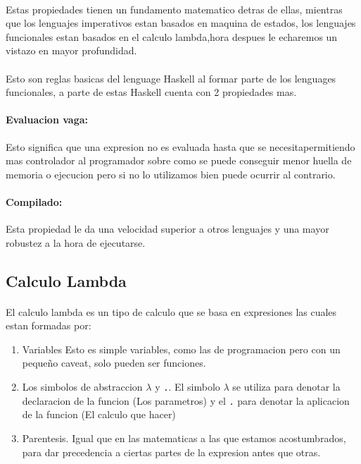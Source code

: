 \documentclass{article}
\begin{document}
		\paragraph{} Estas propiedades tienen un fundamento matematico detras de ellas, mientras que los lenguajes imperativos estan basados en maquina de estados, los lenguajes funcionales estan basados en el calculo lambda,hora despues le echaremos un vistazo en mayor profundidad.

		\paragraph{} Esto son reglas basicas del lenguage Haskell al formar parte de los lenguages funcionales, a parte de estas Haskell cuenta con 2 propiedades mas.
		
		\paragraph{Evaluacion vaga:} Esto significa que una expresion no es evaluada hasta que se necesitapermitiendo mas controlador al programador sobre como se puede conseguir menor huella de memoria o ejecucion pero si no lo utilizamos bien puede ocurrir al contrario.
		
		\paragraph{Compilado:} Esta propiedad le da una velocidad superior a otros lenguajes y una mayor robustez a la hora de ejecutarse.

		\subsection{Calculo Lambda}
			\paragraph{} El calculo lambda es un tipo de calculo que se basa en expresiones las cuales estan formadas por:
			\begin{enumerate}
				\item Variables Esto es simple variables, como las de programacion pero con un pequeño caveat, solo pueden ser funciones.
				\item Los simbolos de abstraccion $\lambda$ y \verb+.+. El simbolo $\lambda$ se utiliza para denotar la declaracion de la funcion (Los parametros) y el \verb+.+ para denotar la aplicacion de la funcion (El calculo que hacer)
				\item Parentesis. Igual que en las matematicas a las que estamos acostumbrados, para dar precedencia a ciertas partes de la expresion antes que otras.
			\end{enumerate}
\end{document}

